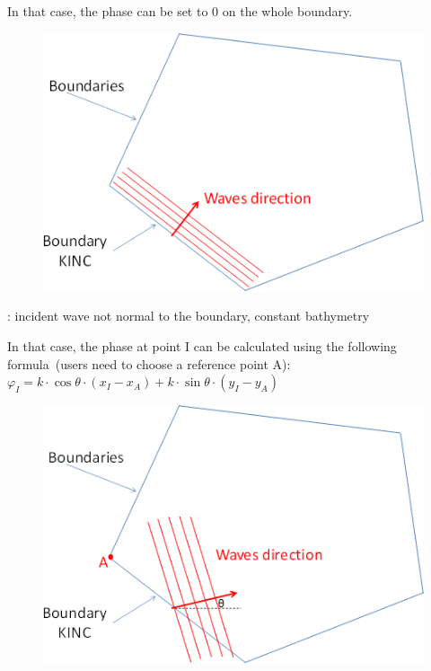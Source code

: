     \begin{minipage}[b]{0.5\textwidth}
In that case, the phase can be set to 0 on the whole boundary.

    \end{minipage}%
    \begin{minipage}[b]{0.4\textwidth}
      \begin{figure}[H]%
        \centering
        \includegraphics[width=\textwidth]{./graphics/example1}
      \end{figure}
    \end{minipage}%

: incident wave not normal to the boundary, constant bathymetry

    \begin{minipage}[b]{0.6\textwidth}
      In that case, the phase at point I can be calculated using the following
      formula~(users need to choose a reference point A):\\
      $\varphi_{I} =k\cdot \cos \theta \cdot (x_{I} -x_{A} )+
        k\cdot \sin \theta \cdot (y_{I} -y_{A})$

    \end{minipage}%
    \begin{minipage}[b]{0.4\textwidth}
      \begin{figure}[H]%
        \centering
        \includegraphics[width=\textwidth]{./graphics/example2}
      \end{figure}
    \end{minipage}%


